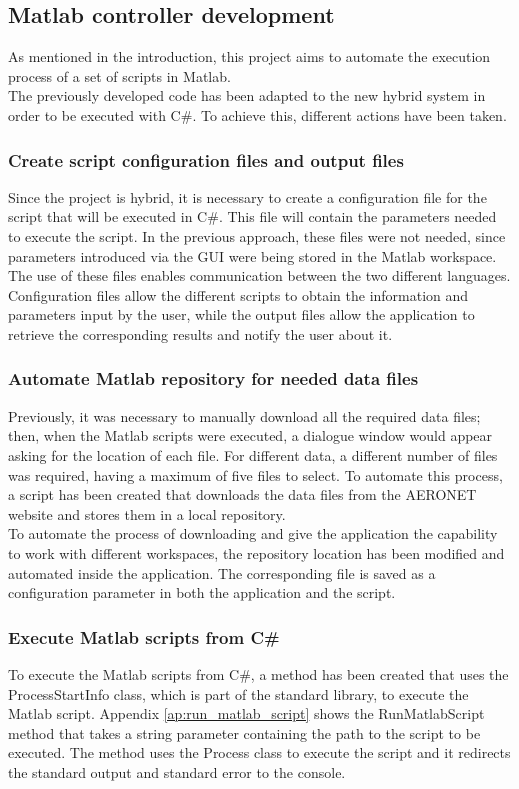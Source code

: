 \subsection{Matlab controller development}
{As mentioned in the introduction, this project aims to automate the execution process of a set of scripts in Matlab. \smallskip\\
The previously developed code has been adapted to the new hybrid system in order to be executed with C\#. To achieve this, different actions have been taken.}
\subsubsection{Create script configuration files and output files}
{Since the project is hybrid, it is necessary to create a configuration file for the script that will be executed in C\#. This file will contain the parameters needed to execute the script. In the previous approach, these files were not needed, since parameters introduced via the GUI were being stored in the Matlab workspace. The use of these files enables communication between the two different languages. Configuration files allow the different scripts to obtain the information and parameters input by the user, while the output files allow the application to retrieve the corresponding results and notify the user about it.}
\subsubsection{Automate Matlab repository for needed data files}
{Previously, it was necessary to manually download all the required data files; then, when the Matlab scripts were executed, a dialogue window would appear asking for the location of each file. For different data, a different number of files was required, having a maximum of five files to select. To automate this process, a script has been created that downloads the data files from the AERONET website and stores them in a local repository.\smallskip\\
To automate the process of downloading and give the application the capability to work with different workspaces, the repository location has been modified and automated inside the application. The corresponding file is saved as a configuration parameter in both the application and the script.}
\subsubsection{Execute Matlab scripts from C\#}
{To execute the Matlab scripts from C\#, a method has been created that uses the ProcessStartInfo class, which is part of the standard library, to execute the Matlab script. Appendix \ref{ap:run_matlab_script} shows the RunMatlabScript method that takes a string parameter containing the path to the script to be executed. The method uses the Process class to execute the script and it redirects the standard output and standard error to the console.\smallskip}
